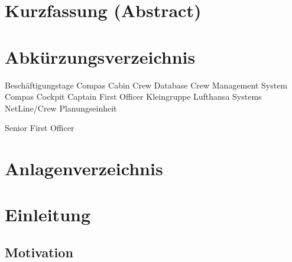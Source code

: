\documentclass [12pt, a4paper, oneside, titlepage, ngerman]{article}
\begin{document}
\tableofcontents
\newpage


\section*{Kurzfassung (Abstract)}
\newpage


\section*{Abkürzungsverzeichnis}

\begin{acronym}[NL/C]

 {Beschäftigungstage}
 {Compas Cabin}
 {Crew Database}
 {Crew Management System}
 {Compas Cockpit}
 {Captain}
 {First Officer}
 {Kleingruppe}
 {Lufthansa Systems}
 {NetLine/Crew}
 {Planungseinheit}

 {Senior First Officer}


\end{acronym}
\newpage


\listoffigures
\newpage

\section*{Anlagenverzeichnis}
\newpage

\setcounter{page}{1}
\section{Einleitung}
\subsection {Motivation}
\end{document}
